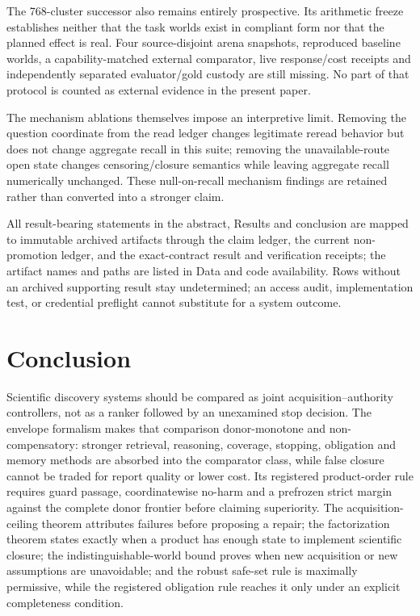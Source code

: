 \documentclass[11pt]{article}
\theoremstyle{definition}
\begin{document}
The 768-cluster successor also remains entirely prospective.  Its arithmetic
freeze establishes neither that the task worlds exist in compliant form nor
that the planned effect is real.  Four source-disjoint arena snapshots,
reproduced baseline worlds, a capability-matched external comparator, live
response/cost receipts and independently separated evaluator/gold custody are
still missing.  No part of that protocol is counted as external evidence in the
present paper.

The mechanism ablations themselves impose an interpretive limit. Removing the question coordinate from the read ledger changes legitimate reread behavior but does not change aggregate recall in this suite; removing the unavailable-route open state changes censoring/closure semantics while leaving aggregate recall numerically unchanged. These null-on-recall mechanism findings are retained rather than converted into a stronger claim.

All result-bearing statements in the abstract, Results and conclusion are mapped to immutable archived artifacts through the claim ledger, the current non-promotion ledger, and the exact-contract result and verification receipts; the artifact names and paths are listed in Data and code availability. Rows without an archived supporting result stay undetermined; an access audit, implementation test, or credential preflight cannot substitute for a system outcome.



\section{Conclusion}
Scientific discovery systems should be compared as joint
acquisition--authority controllers, not as a ranker followed by an unexamined
stop decision.  The envelope formalism makes that comparison donor-monotone and
non-compensatory: stronger retrieval, reasoning, coverage, stopping, obligation
and memory methods are absorbed into the comparator class, while false closure
cannot be traded for report quality or lower cost. Its registered product-order
rule requires guard passage, coordinatewise no-harm and a prefrozen strict
margin against the complete donor frontier before claiming superiority. The acquisition-ceiling
theorem attributes failures before proposing a repair; the factorization theorem
states exactly when a product has enough state to implement scientific closure;
the indistinguishable-world bound proves when new acquisition or new assumptions
are unavoidable; and the robust safe-set rule is maximally permissive, while the
registered obligation rule reaches it only under an explicit completeness
condition.
\end{document}
